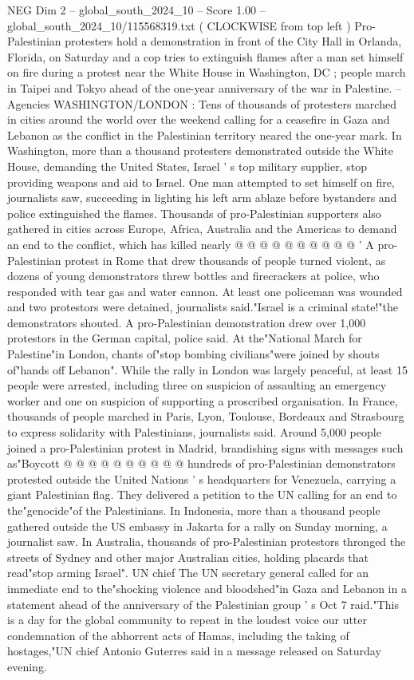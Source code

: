 \begin{textsample}{NEG Dim 2 – global\_south\_2024\_10 – Score 1.00 – global\_south\_2024\_10/115568319.txt}  \label{ex:f2_neg_423}
( CLOCKWISE from top left ) Pro-Palestinian protesters hold a demonstration in front of the City Hall in Orlanda, Florida, on Saturday and a cop tries to extinguish flames after a man set himself on fire during a protest near the White House in Washington, DC ; people march in Taipei and Tokyo ahead of the one-year anniversary of the war in Palestine. -- Agencies WASHINGTON/LONDON : Tens of thousands of protesters marched in cities around the world over the weekend calling for a ceasefire in Gaza and Lebanon as the conflict in the Palestinian territory neared the one-year mark.
In Washington, more than a thousand protesters demonstrated outside the White House, demanding the United States, Israel ' s top military supplier, stop providing weapons and aid to Israel.
One man attempted to set himself on fire, journalists saw, succeeding in lighting his left arm ablaze before bystanders and police extinguished the flames.
Thousands of pro-Palestinian supporters also gathered in cities across Europe, Africa, Australia and the Americas to demand an end to the conflict, which has killed nearly @ @ @ @ @ @ @ @ @ @ ' A pro-Palestinian protest in Rome that drew thousands of people turned violent, as dozens of young demonstrators threw bottles and firecrackers at police, who responded with tear gas and water cannon.
At least one policeman was wounded and two protestors were detained, journalists said."Israel is a criminal state!"the demonstrators shouted.
A pro-Palestinian demonstration drew over 1,000 protestors in the German capital, police said.
At the"National March for Palestine"in London, chants of"stop bombing civilians"were joined by shouts of"hands off Lebanon".
While the rally in London was largely peaceful, at least 15 people were arrested, including three on suspicion of assaulting an emergency worker and one on suspicion of supporting a proscribed organisation.
In France, thousands of people marched in Paris, Lyon, Toulouse, Bordeaux and Strasbourg to express solidarity with Palestinians, journalists said.
Around 5,000 people joined a pro-Palestinian protest in Madrid, brandishing signs with messages such as"Boycott @ @ @ @ @ @ @ @ @ @ hundreds of pro-Palestinian demonstrators protested outside the United Nations ' s headquarters for Venezuela, carrying a giant Palestinian flag.
They delivered a petition to the UN calling for an end to the"genocide"of the Palestinians.
In Indonesia, more than a thousand people gathered outside the US embassy in Jakarta for a rally on Sunday morning, a journalist saw.
In Australia, thousands of pro-Palestinian protestors thronged the streets of Sydney and other major Australian cities, holding placards that read"stop arming Israel".
UN chief The UN secretary general called for an immediate end to the"shocking violence and bloodshed"in Gaza and Lebanon in a statement ahead of the anniversary of the Palestinian group ' s Oct 7 raid."This is a day for the global community to repeat in the loudest voice our utter condemnation of the abhorrent acts of Hamas, including the taking of hostages,"UN chief Antonio Guterres said in a message released on Saturday evening.

\end{textsample}
